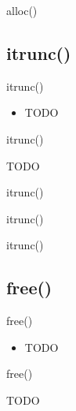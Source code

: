 \documentclass{beamer}
\begin{document}
\begin{frame}{alloc()}
\end{frame}




\subsection{itrunc()}

\begin{frame}{itrunc()}
    \begin{itemize}
        \item TODO
    \end{itemize}
\end{frame}

\begin{frame}{itrunc()}
    \begin{algorithmic}[1]
        \State TODO
    \end{algorithmic}
\end{frame}

\begin{frame}{itrunc()}
\end{frame}

\begin{frame}{itrunc()}
\end{frame}

\begin{frame}{itrunc()}
\end{frame}




\subsection{free()}

\begin{frame}{free()}
    \begin{itemize}
        \item TODO
    \end{itemize}
\end{frame}

\begin{frame}{free()}
    \begin{algorithmic}[1]
        \State TODO
    \end{algorithmic}
\end{frame}
\end{document}
